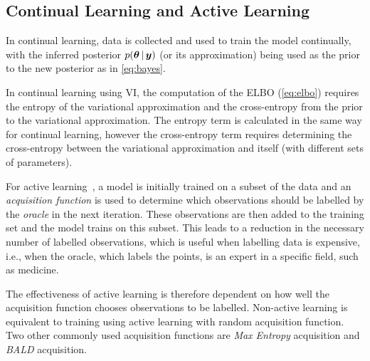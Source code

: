 \documentclass[10pt,a4paper,twocolumn]{article}
\begin{document}


\subsection{Continual Learning and Active Learning}

In continual learning, data is collected and used to train the model continually, with the inferred posterior \(p(\bm \theta \, | \, \bm y)\) (or its approximation) being used as the prior to the new posterior as in \cref{eq:bayes}.

\cite{nguyen2017variational}

In continual learning using VI, the computation of the ELBO (\cref{eq:elbo}) requires the entropy of the variational approximation and the cross-entropy from the prior to the variational approximation.
The entropy term is calculated in the same way for continual learning, however the cross-entropy term requires determining the cross-entropy between the variational approximation and itself (with different sets of parameters).

For active learning~\cite{cohn1996active}, a model is initially trained on a subset of the data and an \emph{acquisition function} is used to determine which observations should be labelled by the \emph{oracle} in the next iteration.
These observations are then added to the training set and the model trains on this subset.
This leads to a reduction in the necessary number of labelled observations, which is useful when labelling data is expensive, i.e., when the oracle, which labels the points, is an expert in a specific field, such as medicine.

The effectiveness of active learning is therefore dependent on how well the acquisition function chooses observations to be labelled.
Non-active learning is equivalent to training using active learning with random acquisition function.
Two other commonly used acquisition functions are \emph{Max Entropy} acquisition and \emph{BALD} acquisition.
\end{document}
